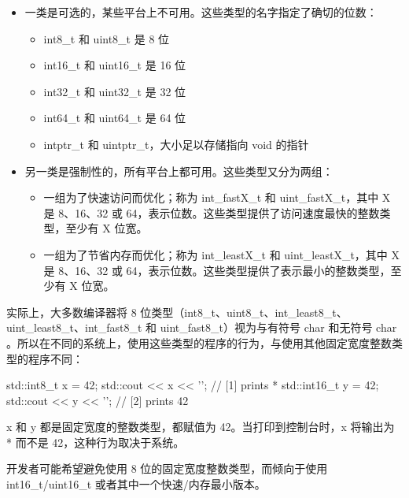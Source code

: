\begin{itemize}
\item
一类是可选的，某些平台上不可用。这些类型的名字指定了确切的位数：

\begin{itemize}
\item
int8\_t 和 uint8\_t 是 8 位

\item
int16\_t 和 uint16\_t 是 16 位

\item
int32\_t 和 uint32\_t 是 32 位

\item
int64\_t 和 uint64\_t 是 64 位

\item
intptr\_t 和 uintptr\_t，大小足以存储指向 void 的指针
\end{itemize}

\item
另一类是强制性的，所有平台上都可用。这些类型又分为两组：

\begin{itemize}
\item
一组为了快速访问而优化；称为 int\_fastX\_t 和 uint\_fastX\_t，其中 X 是 8、16、32 或 64，表示位数。这些类型提供了访问速度最快的整数类型，至少有 X 位宽。

\item
一组为了节省内存而优化；称为 int\_leastX\_t 和 uint\_leastX\_t，其中 X 是 8、16、32 或 64，表示位数。这些类型提供了表示最小的整数类型，至少有 X 位宽。
\end{itemize}
\end{itemize}

实际上，大多数编译器将 8 位类型（int8\_t、uint8\_t、int\_least8\_t、uint\_least8\_t、int\_fast8\_t 和 uint\_fast8\_t）视为与有符号 char 和无符号 char 。所以在不同的系统上，使用这些类型的程序的行为，与使用其他固定宽度整数类型的程序不同：

\begin{cpp}
std::int8_t x = 42;
std::cout << x << '\n'; // [1] prints *
std::int16_t y = 42;
std::cout << y << '\n'; // [2] prints 42
\end{cpp}

x 和 y 都是固定宽度的整数类型，都赋值为 42。当打印到控制台时，x 将输出为 * 而不是 42，这种行为取决于系统。

开发者可能希望避免使用 8 位的固定宽度整数类型，而倾向于使用 int16\_t/uint16\_t 或者其中一个快速/内存最小版本。

